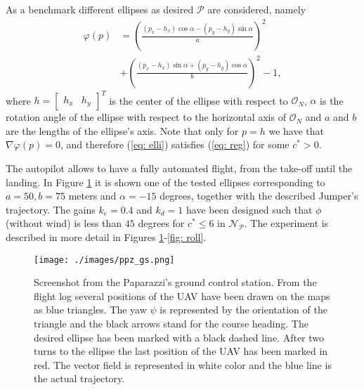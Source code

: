 \documentclass[letterpaper, 10 pt, conference]{ieeeconf}  %
\begin{document}
As a benchmark different ellipses as desired $\mathcal{P}$ are considered, namely
\begin{align}
	\varphi(p) &= \left(\frac{(p_x - h_x)\cos\alpha - (p_y - h_y)\sin\alpha}{a}\right)^2 \nonumber \\ &+ \left(\frac{(p_x - h_x)\sin\alpha + (p_y - h_y)\cos\alpha}{b}\right)^2 - 1,
\label{eq: elli}
\end{align}
where $h = \begin{bmatrix}h_x & h_y\end{bmatrix}^T$ is the center of the ellipse with respect to $\mathcal{O}_N$, $\alpha$ is the rotation angle of the ellipse with respect to the horizontal axis of $\mathcal{O}_N$ and $a$ and $b$ are the lengths of the ellipse's axis. Note that only for $p = h$ we have that $\nabla\varphi(p) = 0$, and therefore (\ref{eq: elli}) satisfies (\ref{eq: reg}) for some $c^* > 0$.

The autopilot allows to have a fully automated flight, from the take-off until the landing. In Figure \ref{fig: xy} it is shown one of the tested ellipses corresponding to $a = 50, b = 75$ meters and $\alpha = -15$ degrees, together with the described Jumper's trajectory. The gains $k_e = 0.4$ and $k_d = 1$ have been designed such that $\phi$ (without wind) is less than $45$ degrees for $c^* \leq 6$ in $\mathcal{N}_{\mathcal{P}}$. The experiment is described in more detail in Figures \ref{fig: xy}-\ref{fig: roll}.

\begin{comment}
\begin{figure*}[tb]
\centering
\texttt{[image: ./images/mapa\_jumper.png]}
	\caption{Screenshot of the Paparazzi's ground control station. From the flight log several positions of the UAV have been drawn on the map as blue triangles. The yaw $\psi$ is represented by the orientation of the triangle and the black arrows stand for the course heading. The desired ellipse has been marked with a black dashed line. The last position of the UAV has been marked, after two turns to the ellipse, in red color. The vector field is represented in white color and the blue line is the actual trajectory. The wind is about $5$m/s (almost $50\%$ of the airspeed of the UAV), blowing to the East.}
\label{fig: xy}
\end{figure*}
\end{comment}

\begin{figure}[tb]
\centering
\texttt{[image: ./images/ppz\_gs.png]}
	\caption{Screenshot from the Paparazzi's ground control station. From the flight log several positions of the UAV have been drawn on the maps as blue triangles. The yaw $\psi$ is represented by the orientation of the triangle and the black arrows stand for the course heading. The desired ellipse has been marked with a black dashed line. After two turns to the ellipse the last position of the UAV has been marked in red. The vector field is represented in white color and the blue line is the actual trajectory.}
\label{fig: xy}
\end{figure}
\end{document}

